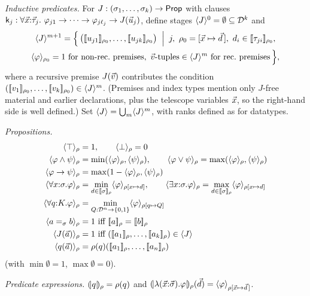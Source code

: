 \begin{definition}[Interpretations]
\emph{Inductive predicates.}  For $J : (\sigma_1, \dots, \sigma_k) \to
\mathsf{Prop}$ with clauses $\mathsf{k}_j : \forall \vec{x}{:}\vec{\tau}_j.\
\varphi_{j1} \to \dots \to \varphi_{j\ell_j} \to J(\vec{u}_j)$, define
stages $\langle J \rangle^0 = \emptyset \subseteq \mathcal{D}^k$ and
\begin{multline*}
  \langle J \rangle^{m+1} = \Bigl\{\, \bigl([\![ u_{j1} ]\!]_{\rho_0}, \dots,
    [\![ u_{jk} ]\!]_{\rho_0}\bigr) \;\Bigm|\;
    j,\ \rho_0 = [\vec{x} \mapsto \vec{d}\,],\
    d_i \in [\![ \tau_{ji} ]\!]_{\rho_0},\\
    \langle \varphi \rangle_{\rho_0} = 1 \text{ for non-rec.\ premises},\
    \vec{v}\text{-tuples} \in \langle J \rangle^m \text{ for rec.\ premises}
  \,\Bigr\},
\end{multline*}
where a recursive premise $J(\vec{v})$ contributes the condition
$([\![ v_1 ]\!]_{\rho_0}, \dots, [\![ v_k ]\!]_{\rho_0}) \in \langle J \rangle^m$.
(Premises and index types mention only $J$-free material and earlier
declarations, plus the telescope variables $\vec{x}$, so the right-hand
side is well defined.)  Set $\langle J \rangle = \bigcup_m \langle J \rangle^m$, with ranks
defined as for datatypes.

\emph{Propositions.}
\begin{align*}
  \pvr{\top}{\rho} &= 1, \qquad \pvr{\bot}{\rho} = 0\\
  \pvr{\varphi \wedge \psi}{\rho} &= \min(\pvr{\varphi}{\rho},
    \pvr{\psi}{\rho}), \qquad
  \pvr{\varphi \vee \psi}{\rho} = \max(\pvr{\varphi}{\rho},
    \pvr{\psi}{\rho})\\
  \pvr{\varphi \to \psi}{\rho} &= \max(1 - \pvr{\varphi}{\rho},
    \pvr{\psi}{\rho})\\
  \pvr{\forall x{:}\sigma.\varphi}{\rho} &=
    \min_{d \in \semr{\sigma}{\rho}} \pvr{\varphi}{\rho[x \mapsto d]},
  \qquad
  \pvr{\exists x{:}\sigma.\varphi}{\rho} =
    \max_{d \in \semr{\sigma}{\rho}} \pvr{\varphi}{\rho[x \mapsto d]}\\
  \pvr{\forall q{:}K.\varphi}{\rho} &=
    \min_{Q : \Dom^n \to \{0,1\}} \pvr{\varphi}{\rho[q \mapsto Q]}\\
  \pvr{a =_\sigma b}{\rho} &= 1 \text{ iff } \sem{a}_\rho = \sem{b}_\rho\\
  \pvr{J(\tup{a})}{\rho} &= 1 \text{ iff }
    (\sem{a_1}_\rho, \dots, \sem{a_k}_\rho) \in \pv{J}\\
  \pvr{q(\tup{a})}{\rho} &= \rho(q)(\sem{a_1}_\rho, \dots,
    \sem{a_n}_\rho)
\end{align*}
(with $\min \emptyset = 1$, $\max \emptyset = 0$).

\emph{Predicate expressions.}  $(\!| q |\!)_{\rho} = \rho(q)$ and
$(\!| \lambda(\vec{x}{:}\vec{\sigma}).\varphi |\!)_{\rho}(\vec{d}) =
\langle \varphi \rangle_{\rho[\vec{x} \mapsto \vec{d}\,]}$.
\end{definition}

